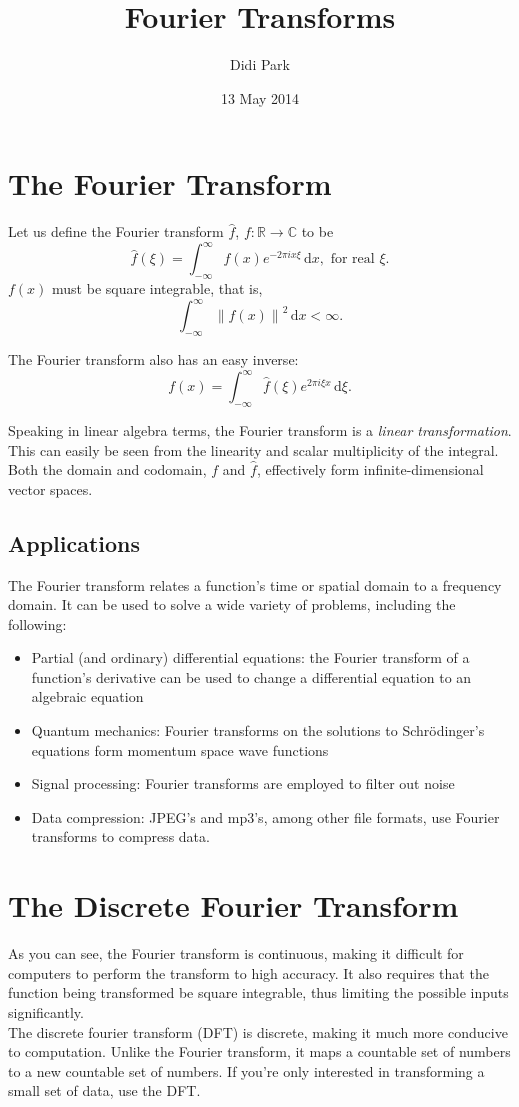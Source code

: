 \documentclass[11pt]{article}
\title{Fourier Transforms}
\author{Didi Park}
\date{13 May 2014}
\begin{document}
\maketitle

\section{The Fourier Transform}
Let us define the Fourier transform $\hat{f}$, $f: \mathbb{R}\rightarrow\mathbb{C}$ to be
$$\hat{f}(\xi)=\int_{-\infty}^{\infty}f(x)e^{-2\pi i x \xi}\, \mathrm{d}x, \textrm{ for real }\xi.$$
$f(x)$ must be square integrable, that is,
$$\int_{-\infty}^{\infty} {\| f(x) \|}^2\,  \mathrm{d}x <\infty.$$

The Fourier transform also has an easy inverse:
$$f(x)=\int_{-\infty}^{\infty} \hat{f}(\xi)e^{2\pi i \xi x}\, \mathrm{d}\xi.$$

Speaking in linear algebra terms, the Fourier transform is a \emph{linear transformation}. This can easily be seen from the linearity and scalar multiplicity of the integral. Both the domain and codomain, $f$ and $\hat{f}$, effectively form infinite-dimensional vector spaces.
\subsection{Applications}
The Fourier transform relates a function's time or spatial domain to a frequency domain. 
It can be used to solve a wide variety of problems, including the following:
\begin{itemize}
\item Partial (and ordinary) differential equations: the Fourier transform of a function's derivative can be used to change a differential equation to an algebraic equation
\item Quantum mechanics: Fourier transforms on the solutions to Schr\"{o}dinger's equations form momentum space wave functions
\item Signal processing: Fourier transforms are employed to filter out noise
\item Data compression: JPEG's and mp3's, among other file formats, use Fourier transforms to compress data.
\end{itemize}

\section{The Discrete Fourier Transform}
As you can see, the Fourier transform is continuous, making it difficult for computers to perform the transform to high accuracy. It also requires that the function being transformed be square integrable, thus limiting the possible inputs significantly.\\
The discrete fourier transform (DFT) is discrete, making it much more conducive to computation. Unlike the Fourier transform, it maps a countable set of numbers to a new countable set of numbers. If you're only interested in transforming a small set of data, use the DFT.
\end{document}
